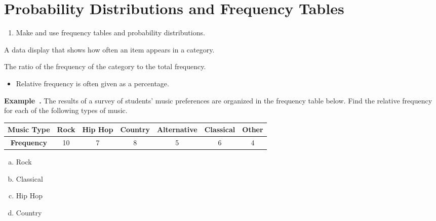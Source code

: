 \documentclass{article}
\newcounter{example}[section]
\newenvironment{example}[1][]{\refstepcounter{example}\par\medskip
   {\color{red}\textbf{Example~\theexample. #1}}}{\medskip}
\begin{document}
\section*{Probability Distributions and Frequency Tables}

\begin{tcolorbox}[colframe=orange!70!white, coltitle=black, title=\textbf{Today I Can}]
\begin{enumerate}
    \item Make and use frequency tables and probability distributions.
\end{enumerate}
\end{tcolorbox}
\smallskip 

\begin{tcolorbox}[colframe=black!20!white, opacitybacktitle=0.1, coltitle=black, title=\textbf{Frequency Table}]
A data display that shows how often an item appears in a category.
\end{tcolorbox}
\smallskip 

\begin{tcolorbox}[colframe=black!20!white, opacitybacktitle=0.1, coltitle=black, title=\textbf{Relative Frequency}]
The ratio of the frequency of the category to the total frequency. 
\begin{itemize}
    \item Relative frequency is often given as a percentage.
\end{itemize}
\end{tcolorbox}
\smallskip 

\begin{example}
The results of a survey of students' music preferences are organized in the frequency table below. Find the relative frequency for each of the following types of music.

\begin{center}
    \begin{tabular}{c|c|c|c|c|c|c}
        \textbf{Music Type} & Rock & Hip Hop& Country & Alternative & Classical & Other \\ \hline 
        \textbf{Frequency} & 10 & 7 & 8 & 5 & 6 & 4 
    \end{tabular}
\end{center}
\bigskip 

\begin{multicols}{4}
\begin{enumerate}[(a)]
    \item Rock
    \item Classical
    \item Hip Hop
    \item Country
\end{enumerate}
\end{multicols}
\end{example}
\end{document}
